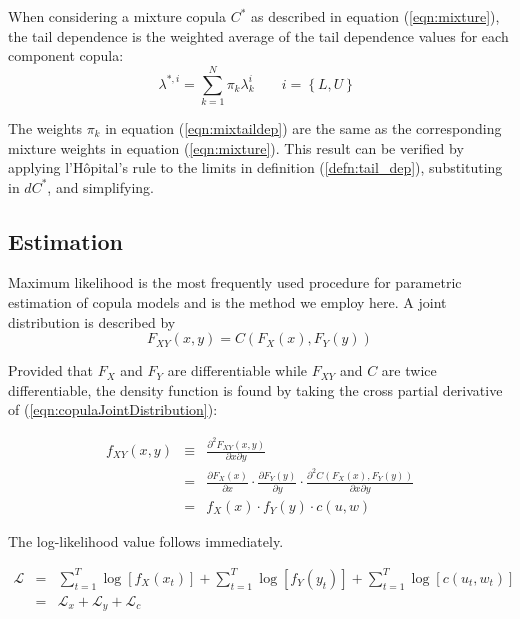 \documentclass[12pt]{article}
\newcommand{\Lagr}{\mathcal{L}}
\begin{document}
When considering a mixture copula $C^{\ast }$ as described in equation (\ref{eqn:mixture}), the tail dependence is the weighted average of the tail dependence values for each component copula: 
\begin{equation} \label{eqn:mixtaildep}
\lambda^{\ast, i} = \sum_{k=1}^{N}\pi _{k}\lambda_{k}^{i}
\begin{array}{c}
~~~~~~~i = \left\{L,U\right\} 
\end{array}
\end{equation}

The weights $\pi_{k}$ in equation (\ref{eqn:mixtaildep}) are the same as the corresponding mixture weights in equation (\ref{eqn:mixture}). This result can be verified by applying l'H\^{o}pital's rule to the limits in definition (\ref{defn:tail_dep}), substituting in $dC^{\ast}$, and simplifying.

 \subsection{Estimation}

Maximum likelihood is the most frequently used procedure for parametric estimation of copula models and is the method we employ here. A joint distribution is described by
\begin{equation} \label{eqn:copulaJointDistribution}
F_{XY}\left(x,y\right) = C\left(F_{X}\left(x\right), F_{Y}\left(y\right)\right)
\end{equation}

Provided that $F_{X}$ and $F_{Y}$ are differentiable while $F_{XY}$ and $C$ are twice differentiable, the density function is found by taking the cross partial derivative of (\ref{eqn:copulaJointDistribution}):

\begin{eqnarray*}
f_{XY}\left(x,y\right) &\equiv& \frac{\partial^{2}F_{XY}\left(x,y\right)}{\partial x \partial y} \\
&=& \frac{\partial F_{X}\left(x\right)}{\partial x} \cdot \frac{\partial F_{Y}\left(y\right)}{\partial y} \cdot \frac{\partial^{2}C\left(F_{X}\left(x\right), F_{Y}\left(y\right)\right)}{\partial x\partial y} \\
&=& f_{X}\left(x\right) \cdot f_{Y}\left(y\right) \cdot c\left(u,w\right)
\end{eqnarray*}

The log-likelihood value follows immediately.

\begin{eqnarray*}
\Lagr &=& \sum\nolimits_{t=1}^{T}\log \left[f_{X}\left(x_{t}\right)\right] + \sum\nolimits_{t=1}^{T}\log \left[f_{Y}\left(y_{t}\right)\right]
+ \sum\nolimits_{t=1}^{T}\log \left[c\left(u_{t}, w_{t}\right)\right] \\
&=& \Lagr_{x} + \Lagr_{y} + \Lagr_{c}
\end{eqnarray*}
\end{document}
